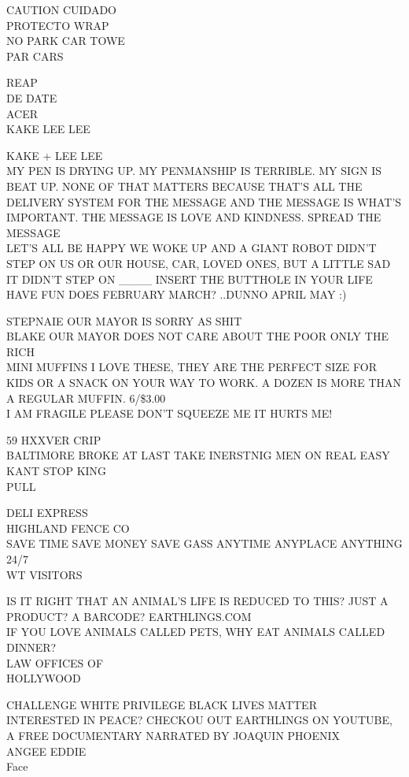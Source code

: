 \documentclass[10pt,letterpaper]{article}
\begin{document}
CAUTION CUIDADO\\
PROTECTO WRAP\\
NO PARK CAR TOWE\\
PAR CARS

REAP\\
DE DATE\\
ACER\\
KAKE LEE LEE

KAKE + LEE LEE\\
MY PEN IS DRYING UP.  MY PENMANSHIP IS TERRIBLE.  MY SIGN IS BEAT UP.  NONE OF THAT MATTERS BECAUSE THAT'S ALL THE DELIVERY SYSTEM FOR THE MESSAGE AND THE MESSAGE IS WHAT'S IMPORTANT.  THE MESSAGE IS LOVE AND KINDNESS.  SPREAD THE MESSAGE\\
LET'S ALL BE HAPPY WE WOKE UP AND A GIANT ROBOT DIDN'T STEP ON US OR OUR HOUSE, CAR, LOVED ONES, BUT A LITTLE SAD IT DIDN'T STEP ON \_\_\_\_ INSERT THE BUTTHOLE IN YOUR LIFE\\
HAVE FUN DOES FEBRUARY MARCH?  ..DUNNO APRIL MAY :)

STEPNAIE OUR MAYOR IS SORRY AS SHIT\\
BLAKE OUR MAYOR DOES NOT CARE ABOUT THE POOR ONLY THE RICH\\
MINI MUFFINS I LOVE THESE, THEY ARE THE PERFECT SIZE FOR KIDS OR A SNACK ON YOUR WAY TO WORK.  A DOZEN IS MORE THAN A REGULAR MUFFIN.  6/\$3.00\\
I AM FRAGILE PLEASE DON'T SQUEEZE ME IT HURTS ME!

59 HXXVER CRIP\\
BALTIMORE BROKE AT LAST TAKE INERSTNIG MEN ON REAL EASY\\
KANT STOP KING\\
PULL

DELI EXPRESS\\
HIGHLAND FENCE CO\\
SAVE TIME SAVE MONEY SAVE GASS ANYTIME ANYPLACE ANYTHING 24/7\\
WT VISITORS

IS IT RIGHT THAT AN ANIMAL'S LIFE IS REDUCED TO THIS?  JUST A PRODUCT?  A BARCODE?  EARTHLINGS.COM\\
IF YOU LOVE ANIMALS CALLED PETS, WHY EAT ANIMALS CALLED DINNER?\\
LAW OFFICES OF\\
HOLLYWOOD

CHALLENGE WHITE PRIVILEGE BLACK LIVES MATTER\\
INTERESTED IN PEACE?  CHECKOU OUT EARTHLINGS ON YOUTUBE, A FREE DOCUMENTARY NARRATED BY JOAQUIN PHOENIX\\
ANGEE EDDIE\\
Face
\end{document}
